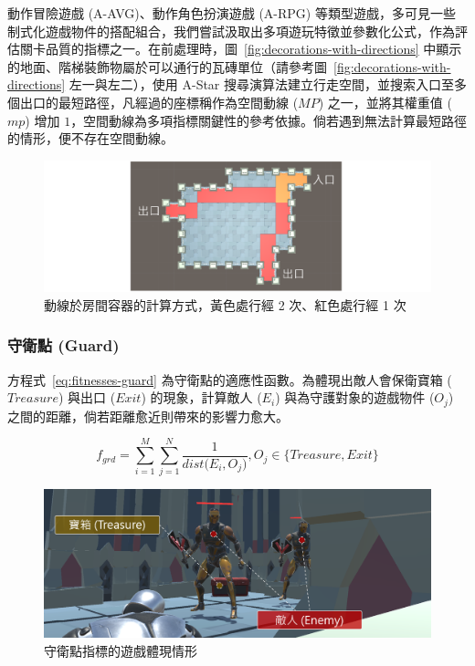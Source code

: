 動作冒險遊戲 (A-AVG)、動作角色扮演遊戲 (A-RPG) 等類型遊戲，多可見一些制式化遊戲物件的搭配組合，我們嘗試汲取出多項遊玩特徵並參數化公式，作為評估關卡品質的指標之一。在前處理時，圖~\ref{fig:decorations-with-directions} 中顯示的地面、階梯裝飾物屬於可以通行的瓦磚單位（請參考圖~\ref{fig:decorations-with-directions} 左一與左二），使用 A-Star 搜尋演算法建立行走空間，並搜索入口至多個出口的最短路徑，凡經過的座標稱作為空間動線 ($MP$) 之一，並將其權重值 ($mp$) 增加 $1$，空間動線為多項指標關鍵性的參考依據。倘若遇到無法計算最短路徑的情形，便不存在空間動線。

\begin{figure}[ht]
  \begin{center}
    \includegraphics[width=1.0\textwidth]{figures/fitnesses-mainpath.png}
    \caption{動線於房間容器的計算方式，黃色處行經 2 次、紅色處行經 1 次}
    \label{fig:fitnesses-mainpath}
  \end{center}
\end{figure}

\subsubsection{守衛點 (Guard)}
\label{sssec:method-segments-fitnesses-guard}

方程式~\ref{eq:fitnesses-guard} 為守衛點的適應性函數。為體現出敵人會保衛寶箱 ($Treasure$) 與出口 ($Exit$) 的現象，計算敵人 ($E_{i}$) 與為守護對象的遊戲物件 ($O_{j}$) 之間的距離，倘若距離愈近則帶來的影響力愈大。

\begin{equation}
    \label{eq:fitnesses-guard}
    f_{grd} = \sum_{i=1}^{M} \sum_{j=1}^{N} \frac{1}{dist\big(E_{i}, O_{j}\big)}, O_{j} \in \{ Treasure, Exit \}
\end{equation}

\begin{figure}[ht]
  \begin{center}
    \includegraphics[width=1.0\textwidth]{figures/fitnesses-guard-gameplay.png}
    \caption{守衛點指標的遊戲體現情形}
    \label{fig:fitnesses-guard-gameplay}
  \end{center}
\end{figure}

